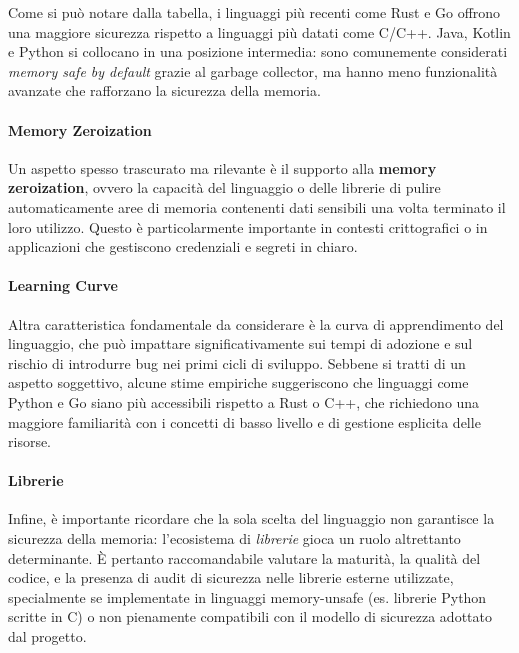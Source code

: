 Come si può notare dalla tabella, i linguaggi più recenti come Rust e Go offrono
una maggiore sicurezza rispetto a linguaggi più datati come C/C++. Java, Kotlin e
Python si collocano in una posizione intermedia: sono comunemente considerati
\textit{memory safe by default} grazie al garbage collector, ma hanno meno
funzionalità avanzate che rafforzano la sicurezza della memoria.

\paragraph{Memory Zeroization}
Un aspetto spesso trascurato ma rilevante è il supporto alla \textbf{memory
zeroization}, ovvero la capacità del linguaggio o delle librerie di pulire automaticamente
aree di memoria contenenti dati sensibili una volta terminato il loro utilizzo.
Questo è particolarmente importante in contesti crittografici o in applicazioni
che gestiscono credenziali e segreti in chiaro.

\paragraph{Learning Curve}
Altra caratteristica fondamentale da considerare è la curva di apprendimento del
linguaggio, che può impattare significativamente sui tempi di adozione e sul
rischio di introdurre bug nei primi cicli di sviluppo. Sebbene si tratti di un aspetto
soggettivo, alcune stime empiriche\cite{learning_curves} suggeriscono che linguaggi
come Python e Go siano più accessibili rispetto a Rust o C++, che richiedono una
maggiore familiarità con i concetti di basso livello e di gestione esplicita
delle risorse.

\paragraph{Librerie}
Infine, è importante ricordare che la sola scelta del linguaggio non garantisce
la sicurezza della memoria: l'ecosistema di \textit{librerie} gioca un ruolo
altrettanto determinante. È pertanto raccomandabile valutare la maturità, la
qualità del codice, e la presenza di audit di sicurezza nelle librerie esterne utilizzate,
specialmente se implementate in linguaggi memory-unsafe (es. librerie Python
scritte in C) o non pienamente compatibili con il modello di sicurezza adottato dal
progetto.